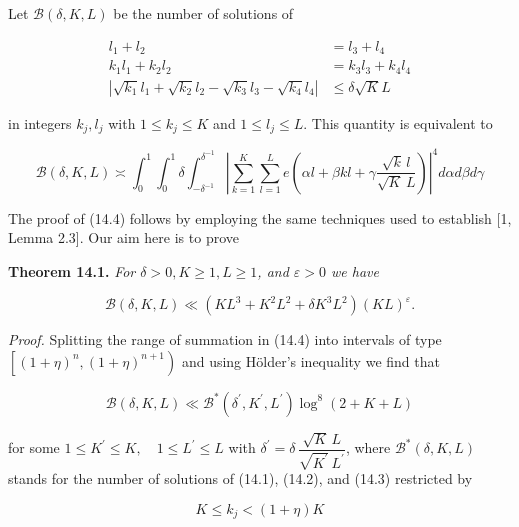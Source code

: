 \documentclass[10pt]{article}
\begin{document}
Let $\mathscr{B}(\delta, K, L)$ be the number of solutions of


\begin{align*}
l_{1}+l_{2} & =l_{3}+l_{4}  \tag{14.1}\\
k_{1} l_{1}+k_{2} l_{2} & =k_{3} l_{3}+k_{4} l_{4}  \tag{14.2}\\
\left|\sqrt{k_{1}} l_{1}+\sqrt{k_{2}} l_{2}-\sqrt{k_{3}} l_{3}-\sqrt{k_{4}} l_{4}\right| & \leqslant \delta \sqrt{K} L \tag{14.3}
\end{align*}


in integers $k_{j}, l_{j}$ with $1 \leqslant k_{j} \leqslant K$ and $1 \leqslant l_{j} \leqslant L$. This quantity is equivalent to


\begin{equation*}
\mathscr{B}(\delta, K, L) \asymp \int_{0}^{1} \int_{0}^{1} \delta \int_{-\delta^{-1}}^{\delta^{-1}}\left|\sum_{k=1}^{K}\sum_{l=1}^{L}e\left(\alpha l+\beta kl+\gamma\frac{\sqrt{k}\,l}{\sqrt{K}\,L}\right)\right|^{4} d \alpha d \beta d \gamma \tag{14.4}
\end{equation*}


The proof of (14.4) follows by employing the same techniques used to establish [1, Lemma 2.3]. Our aim here is to prove

\medskip\noindent\textbf{Theorem 14.1.} \textit{For $\delta>0, K \geqslant 1, L \geqslant 1$, and $\varepsilon>0$ we have}

\begin{equation*}
\mathscr{B}(\delta, K, L) \ll\left(K L^{3}+K^{2} L^{2}+\delta K^{3} L^{2}\right)(K L)^{\varepsilon} . \tag{14.5}
\end{equation*}


\medskip\noindent\textit{Proof.} Splitting the range of summation in (14.4) into intervals of type $\left[(1+\eta)^{n},(1+\eta)^{n+1}\right)$ and using Hölder's inequality we find that

$$
\mathscr{B}(\delta,K,L)\ll\mathscr{B}^{*}(\delta^{\prime},K^{\prime},L^{\prime}) \log ^{8}(2+K+L)
$$

for some $1 \leqslant K^{\prime} \leqslant K, \quad 1 \leqslant L^{\prime} \leqslant L$ with $\delta^{\prime}=\delta\,\dfrac{\sqrt{K}\,L}{\sqrt{K^{\prime}}\,L^{\prime}}$, where $\mathscr{B}^{*}(\delta, K, L)$ stands for the number of solutions of (14.1), (14.2), and (14.3) restricted by


\begin{equation*}
K \leqslant k_{j}<(1+\eta) K \tag{14.6}
\end{equation*}
\end{document}
